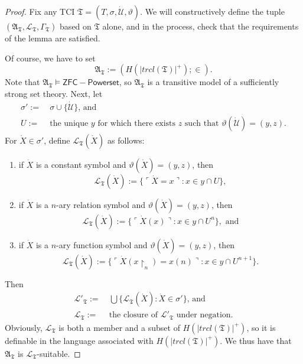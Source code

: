 \documentclass[12pt]{article}
\numberwithin{equation}{section}
\begin{document}
\begin{proof}
Fix any TCI $\mathfrak{T} = (T, \sigma, \dot{\mathcal{U}}, \vartheta)$. We will constructively define the tuple $(\mathfrak{A}_{\mathfrak{T}}, \mathcal{L}_{\mathfrak{T}}, \Gamma_{\mathfrak{T}})$ based on $\mathfrak{T}$ alone, and in the process, check that the requirements of the lemma are satisfied.

Of course, we have to set $$\mathfrak{A}_{\mathfrak{T}} := (H(|trcl(\mathfrak{T})|^+); \in).$$ Note that $\mathfrak{A}_{\mathfrak{T}} \models \mathsf{ZFC - Powerset}$, so $\mathfrak{A}_{\mathfrak{T}}$ is a transitive model of a sufficiently strong set theory. Next, let
\begin{align*}
    \sigma' := \ & \sigma \cup \{\dot{\mathcal{U}}\} \text{, and} \\
    U := \ & \text{the unique } y \text{ for which there exists } z \text{ such that } \vartheta(\dot{\mathcal{U}}) = (y, z).
\end{align*}
For $\dot{X} \in \sigma'$, define $\mathcal{L}_{\mathfrak{T}}(\dot{X})$ as follows:
\begin{enumerate}[label=(L\arabic*)]
    \item if $\dot{X}$ is a constant symbol and $\vartheta(\dot{X}) = (y, z)$, then $$\mathcal{L}_{\mathfrak{T}}(\dot{X}) := \{\ulcorner \dot{X} = x \urcorner : x \in y \cap U\},$$
    \item if $\dot{X}$ is a $n$-ary relation symbol and $\vartheta(\dot{X}) = (y, z)$, then $$\mathcal{L}_{\mathfrak{T}}(\dot{X}) := \{\ulcorner \dot{X}(x) \urcorner : x \in y \cap U^n\}, \text{ and}$$
    \item if $\dot{X}$ is a $n$-ary function symbol and $\vartheta(\dot{X}) = (y, z)$, then $$\mathcal{L}_{\mathfrak{T}}(\dot{X}) := \{\ulcorner \dot{X}(x \! \restriction_n) = x(n) \urcorner : x \in y \cap U^{n+1}\}.$$
\end{enumerate}
Then 
\begin{align*}
    \mathcal{L}'_{\mathfrak{T}} := \ & \bigcup \{\mathcal{L}_{\mathfrak{T}}(\dot{X}) : \dot{X} \in \sigma'\} \text{, and} \\
    \mathcal{L}_{\mathfrak{T}} := \ & \text{the closure of }  \mathcal{L}'_{\mathfrak{T}} \text{ under negation.}
\end{align*}
Obviously, $\mathcal{L}_{\mathfrak{T}}$ is both a member and a subset of $H(|trcl(\mathfrak{T})|^+)$, so it is definable in the language associated with $H(|trcl(\mathfrak{T})|^+)$. We thus have that $\mathfrak{A}_{\mathfrak{T}}$ is $\mathcal{L}_{\mathfrak{T}}$-suitable.


\end{proof}
\end{document}
